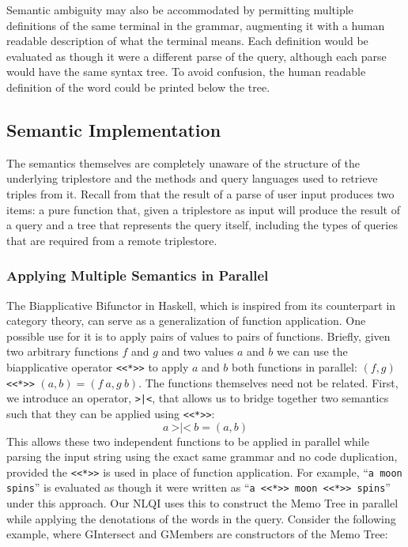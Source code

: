 \documentclass[../main.tex]{subfiles}
\begin{document}
\begin{refsection}
Semantic ambiguity may also be accommodated by permitting multiple definitions of the same terminal in the grammar, augmenting it with a human readable description of what the terminal means.  Each definition would be evaluated as though it were a different parse of the query, although each parse would have the same syntax tree.  To avoid confusion, the human readable definition of the word could be printed below the tree.

\subsection{Semantic Implementation}

The semantics themselves are completely unaware of the structure of the underlying triplestore and the methods and query languages used to retrieve triples from it.
Recall from  that the result of a parse of user input produces two items: a pure function that, given a triplestore as input will produce the result of a query and a tree that represents the query itself, including the types of queries that are required from a remote triplestore.

\subsubsection{Applying Multiple Semantics in Parallel}

The Biapplicative Bifunctor in Haskell, which is inspired from its counterpart in category theory, can serve as a generalization of function application.  One possible use for it is to apply pairs of values to pairs of functions.  Briefly, given two arbitrary functions $f$ and $g$
and two values $a$ and $b$ we can use the biapplicative operator \texttt{<<*>>} to apply $a$ and $b$ both functions in parallel: $(f, g)$ \texttt{<<*>>} $(a, b) = (f\ a, g\ b)$.  The functions themselves need not be related.
First, we introduce an operator, \texttt{>|<}, that allows us to bridge together two semantics such that they can be applied using \texttt{<<*>>}:
\begin{equation*}
	a\ \texttt{>|<}\ b = (a, b)
\end{equation*}
This allows these two independent functions to be applied in parallel while parsing the input string using the exact same grammar and no code duplication, provided the \texttt{<<*>>} is used in place of function application.  For example, ``\texttt{a moon spins}'' is evaluated as though it were written as ``\texttt{a <<*>> moon <<*>> spins}'' under this approach.  Our NLQI uses this to construct the Memo Tree in parallel while applying the denotations of the words in the query.  Consider the following example, where GIntersect and GMembers are constructors of the Memo Tree:


\end{refsection}
\end{document}
